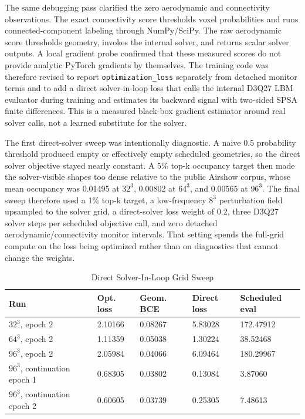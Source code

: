 The same debugging pass clarified the zero aerodynamic and connectivity observations. The exact connectivity score thresholds voxel probabilities and runs connected-component labeling through NumPy/SciPy. The raw aerodynamic score thresholds geometry, invokes the internal solver, and returns scalar solver outputs. A local gradient probe confirmed that these measured scores do not provide analytic PyTorch gradients by themselves. The training code was therefore revised to report \texttt{optimization\_loss} separately from detached monitor terms and to add a direct solver-in-loop loss that calls the internal D3Q27 LBM evaluator during training and estimates its backward signal with two-sided SPSA finite differences. This is a measured black-box gradient estimator around real solver calls, not a learned substitute for the solver.

The first direct-solver sweep was intentionally diagnostic. A naive 0.5 probability threshold produced empty or effectively empty scheduled geometries, so the direct solver objective stayed nearly constant. A 5\% top-k occupancy target then made the solver-visible shapes too dense relative to the public Airshow corpus, whose mean occupancy was 0.01495 at \(32^3\), 0.00802 at \(64^3\), and 0.00565 at \(96^3\). The final sweep therefore used a 1\% top-k target, a low-frequency \(8^3\) perturbation field upsampled to the solver grid, a direct-solver loss weight of 0.2, three D3Q27 solver steps per scheduled objective call, and zero detached aerodynamic/connectivity monitor intervals. That setting spends the full-grid compute on the loss being optimized rather than on diagnostics that cannot change the weights.

\begin{table}[!t]
\centering
\caption{Direct Solver-In-Loop Grid Sweep}
\label{tab:direct_solver_grid_sweep}
\footnotesize
\setlength{\tabcolsep}{2pt}
\begin{tabular}{|p{}|p{}|p{}|p{}|p{}|}
\hline
\textbf{Run} & \textbf{Opt. loss} & \textbf{Geom. BCE} & \textbf{Direct loss} & \textbf{Scheduled eval} \\ \hline
\(32^3\), epoch 2 & 2.10166 & 0.08267 & 5.83028 & 172.47912 \\ \hline
\(64^3\), epoch 2 & 1.11359 & 0.05038 & 1.30224 & 38.52468 \\ \hline
\(96^3\), epoch 2 & 2.05984 & 0.04066 & 6.09464 & 180.29967 \\ \hline
\(96^3\), continuation epoch 1 & 0.68305 & 0.03802 & 0.13084 & 3.87060 \\ \hline
\(96^3\), continuation epoch 2 & 0.60605 & 0.03739 & 0.25305 & 7.48613 \\ \hline
\end{tabular}
\end{table}

